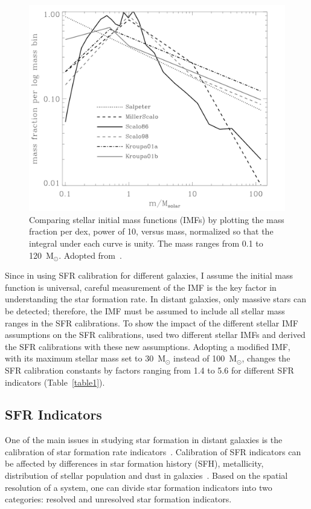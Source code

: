 \begin{figure}
\label{fig: imf}
\centering
\includegraphics[width=16cm]{../image_intro/imf.png}
\small
\caption[Comparing stellar initial mass functions]{Comparing stellar initial mass functions (IMFs) by plotting the mass fraction per dex, power of 10, versus mass, normalized so that the integral under each curve is unity. The mass ranges from 0.1 to 120~M$_\odot$. Adopted from~\cite{Baldry03}.} 
\end{figure}


Since in using SFR calibration for different galaxies, I assume the initial mass function is universal, careful measurement of the IMF is the key factor in understanding the star formation rate. 
In distant galaxies, only massive stars can be detected; therefore, the IMF must be assumed to include all stellar mass ranges in the SFR calibrations. 
To show the impact of the different stellar IMF assumptions on the SFR calibrations, \cite{Calzetti13} used two different stellar IMFs and derived the SFR calibrations with these new assumptions.
Adopting a modified \cite{Kroupa01} IMF, with its maximum stellar mass set to 30~M$_{\odot}$ instead of 100~M$_{\odot}$, changes the SFR calibration constants by factors ranging from 1.4 to 5.6 for different SFR indicators (Table~\ref{table1}). 

\subsection{SFR Indicators}

One of the main issues in studying star formation in distant galaxies is the calibration of star formation rate indicators~\citep[e.g.,][]{Lee10}. 
Calibration of SFR indicators can be affected by differences in star formation history (SFH), metallicity, distribution of stellar population and dust in galaxies~\citep{Calzetti13}. 
Based on the spatial resolution of a system, one can divide star formation indicators into two categories: resolved and unresolved star formation indicators.

